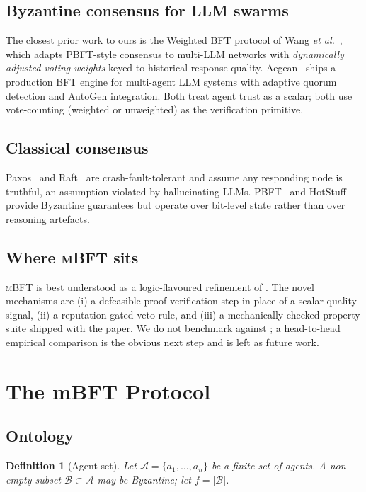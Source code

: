 \documentclass[11pt,conference]{IEEEtran}
\newtheorem{definition}{Definition}
\newcommand{\agentset}{\mathcal{A}}
\newcommand{\mbft}{\textsc{mBFT}}
\begin{document}
\subsection{Byzantine consensus for LLM swarms}
The closest prior work to ours is the Weighted BFT protocol of Wang
\emph{et al.}~\cite{wang2025wbft}, which adapts PBFT-style consensus
to multi-LLM networks with \emph{dynamically adjusted voting weights}
keyed to historical response quality. Aegean~\cite{aegean2025} ships
a production BFT engine for multi-agent LLM systems with adaptive
quorum detection and AutoGen integration. Both treat agent trust as a
scalar; both use vote-counting (weighted or unweighted) as the
verification primitive.

\subsection{Classical consensus}
Paxos~\cite{lamport1998paxos} and Raft~\cite{ongaro2014raft} are
crash-fault-tolerant and assume any responding node is truthful, an
assumption violated by hallucinating LLMs. PBFT~\cite{castro1999pbft}
and HotStuff~\cite{yin2019hotstuff} provide Byzantine guarantees but
operate over bit-level state rather than over reasoning artefacts.

\subsection{Where \mbft{} sits}
\mbft{} is best understood as a logic-flavoured refinement of
\cite{wang2025wbft}. The novel mechanisms are (i) a defeasible-proof
verification step in place of a scalar quality signal, (ii) a
reputation-gated veto rule, and (iii) a mechanically checked property
suite shipped with the paper. We do not benchmark against
\cite{wang2025wbft, aegean2025}; a head-to-head empirical comparison
is the obvious next step and is left as future work.

\section{The mBFT Protocol}
\label{sec:protocol}

\subsection{Ontology}
\begin{definition}[Agent set]
Let $\agentset = \{a_1, \dots, a_n\}$ be a finite set of agents. A
non-empty subset $\mathcal{B} \subset \agentset$ may be Byzantine; let
$f = |\mathcal{B}|$.
\end{definition}
\end{document}
